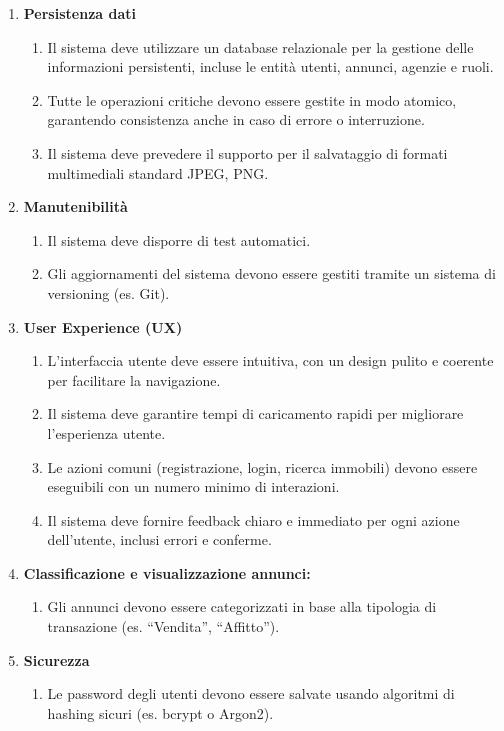 \begin{enumerate}
	\item \textbf{Persistenza dati}
	\begin{enumerate}
		\item Il sistema deve utilizzare un database relazionale per la gestione delle informazioni persistenti, incluse le entità utenti, annunci, agenzie e ruoli.
		\item Tutte le operazioni critiche devono essere gestite in modo atomico, garantendo consistenza anche in caso di errore o interruzione.
		\item Il sistema deve prevedere il supporto per il salvataggio di formati multimediali standard JPEG, PNG.
	\end{enumerate}

	\item \textbf{Manutenibilità}
	\begin{enumerate}
		\item Il sistema deve disporre di test automatici.
		\item Gli aggiornamenti del sistema devono essere gestiti tramite un sistema di versioning (es. Git).
	\end{enumerate}

	\item \textbf{User Experience (UX)}
	\begin{enumerate}
		\item L'interfaccia utente deve essere intuitiva, con un design pulito e coerente per facilitare la navigazione.
		\item Il sistema deve garantire tempi di caricamento rapidi per migliorare l'esperienza utente.
		\item Le azioni comuni (registrazione, login, ricerca immobili) devono essere eseguibili con un numero minimo di interazioni.
		\item Il sistema deve fornire feedback chiaro e immediato per ogni azione dell’utente, inclusi errori e conferme.
	\end{enumerate}

	\item \textbf{Classificazione e visualizzazione annunci:}
	\begin{enumerate}
		\item Gli annunci devono essere categorizzati in base alla tipologia di transazione (es. ``Vendita'', ``Affitto'').
	\end{enumerate}

	\item \textbf{Sicurezza}
	\begin{enumerate}
		\item Le password degli utenti devono essere salvate usando algoritmi di hashing sicuri (es. bcrypt o Argon2).
	\end{enumerate}
\end{enumerate}

